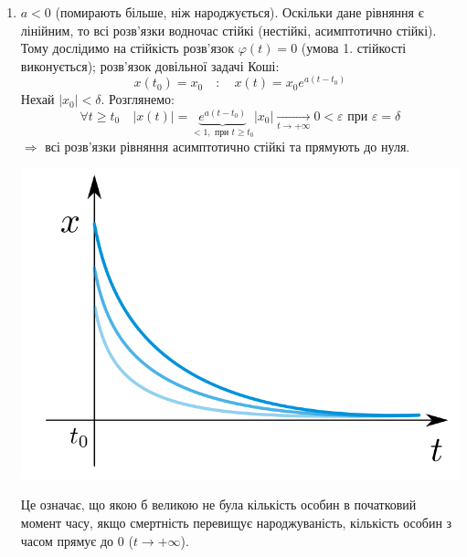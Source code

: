 \documentclass[14pt,a4paper]{scrartcl}
\theoremstyle{definition}
\theoremstyle{definition}
\theoremstyle{definition}
\begin{document}
\begin{enumerate}
  \item $a < 0$ (помирають більше, ніж народжується). Оскільки дане рівняння є лінійним, то всі розв'язки водночас стійкі (нестійкі, асимптотично стійкі). Тому дослідимо на стійкість розв'язок $ \varphi(t) = 0$ (умова 1. стійкості виконується); розв'язок довільної задачі Коші:
  $$
  x(t_0) = x_0 \quad : \quad x(t) = x_0 e^{a (t-t_0)}
  $$
  Нехай $ \left| x_0 \right| < \delta.$ Розглянемо:
  $$
  \forall t \geq t_0 \quad \left| x (t) \right| = \underbrace{e^{a(t-t_0)}}_{<1, \text{ при } t\geq t_0} \left| x_0 \right| \xrightarrow[t\to + \infty]{} 0 < \varepsilon \text{ при } \varepsilon = \delta
  $$
  $\Rightarrow $ всі розв'язки рівняння асимптотично стійкі та прямують до нуля.\\
  \begin{center} \includegraphics[scale=0.33]{assets/lectures_recent-562c17da.png} \end{center}
  Це означає, що якою б великою не була кількість особин в початковий момент часу, якщо смертність перевищує народжуваність, кількість особин з часом прямує до 0 ($t \to + \infty$).


\end{enumerate}
\end{document}
